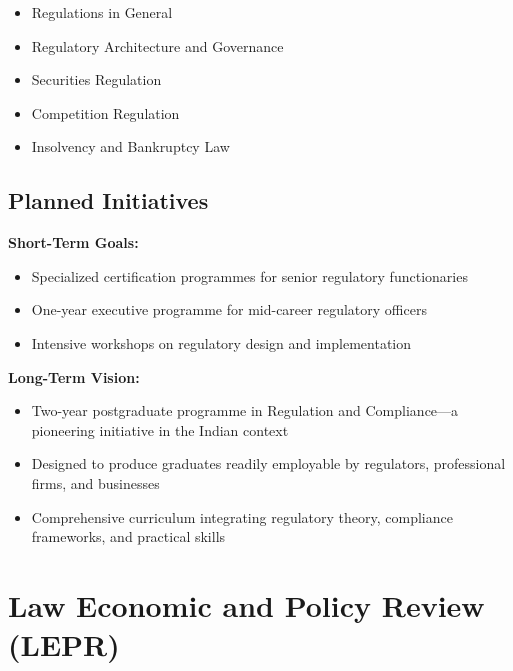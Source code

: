 \documentclass[11pt,a4paper]{article}
\begin{document}
\begin{itemize}[leftmargin=*,noitemsep]
    \item Regulations in General
    \item Regulatory Architecture and Governance
    \item Securities Regulation
    \item Competition Regulation
    \item Insolvency and Bankruptcy Law
\end{itemize}

\clearpage

\subsection*{Planned Initiatives}

\begin{tcolorbox}[colback=vellum,colframe=goldthread,arc=2mm,boxrule=1.5pt]
\textbf{\headingfont Short-Term Goals:}
\begin{itemize}[leftmargin=*,itemsep=0.2cm]
    \item Specialized certification programmes for senior regulatory functionaries
    \item One-year executive programme for mid-career regulatory officers
    \item Intensive workshops on regulatory design and implementation
\end{itemize}

\vspace{0.3cm}

\textbf{\headingfont Long-Term Vision:}
\begin{itemize}[leftmargin=*,itemsep=0.2cm]
    \item Two-year postgraduate programme in Regulation and Compliance—a pioneering initiative in the Indian context
    \item Designed to produce graduates readily employable by regulators, professional firms, and businesses
    \item Comprehensive curriculum integrating regulatory theory, compliance frameworks, and practical skills
\end{itemize}
\end{tcolorbox}

\vspace{1cm}

\section{Law Economic and Policy Review (LEPR)}
\end{document}
